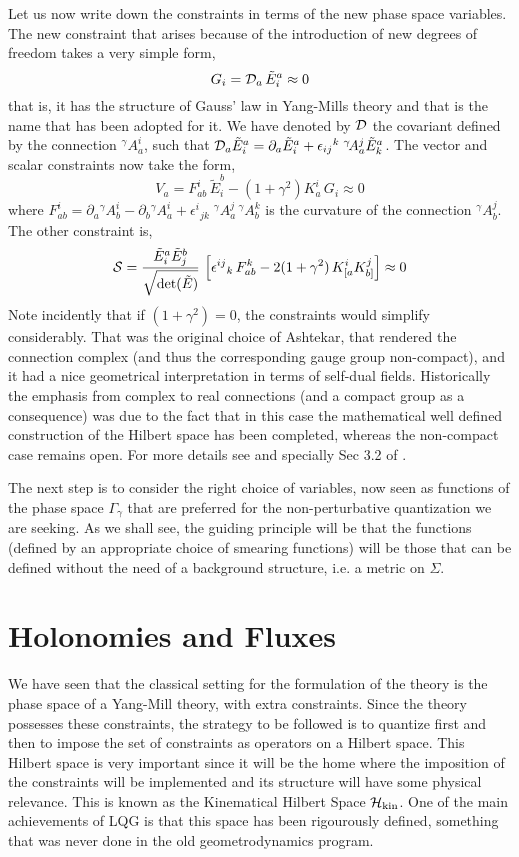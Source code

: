 \documentclass[aps,prd,tightenlines,showpacs,nofootinbib,preprint]{revtex4}
\def\be{\begin{equation}}
\def\ee{\end{equation}}
\def\tE{\tilde{E}}
\def\G{{\Gamma}}  \def\h{\hat} \def\H{{\cal H}} \def\O{{\cal O}}
\def\g{{\gamma}}  \def\a{{\alpha}} \def\l{{\lambda}}
\begin{document}
Let us now write down the constraints in terms of the new phase
space variables. The new constraint that arises because of the
introduction of new degrees of freedom takes a very simple form,
%
\be G_i={\cal D}_a\,\tE^a_i\approx 0 \ee
%
that is, it has the structure of Gauss' law in Yang-Mills theory
and that is the name that has been adopted for it. We have denoted
by ${\cal D}$ the covariant defined by the connection
${}^{\gamma}\!A_a^i$, such that ${\cal
D}_a\tE^a_i=\partial_a\tE^a_i+{\epsilon_{ij}}^{k}\;{}^{\gamma}
\!A_a^j\tE^a_k$. The vector and scalar constraints now take the
form, \be V_a=F^i_{ab}\,\tE^b_i-(1+\g^2)K^i_a\,G_i\approx 0 \ee
%
where
$F^i_{ab}=\partial_{a}{}^{\gamma}\!A_b^i-\partial_{b}{}^{\gamma}\!A_a^i+
{\epsilon^i}_{jk}\;{}^{\gamma}\!A_a^j\,{}^{\gamma}\!A_b^k$ is the
curvature of the connection ${}^{\gamma}\!A_b^j$. The other
constraint is,
%
\be \S=\frac{\tE^a_i\tE^b_j}{\sqrt{{\rm
det}(\tE)}}\,\left[{\epsilon^{ij}}_k\,F^k_{ab}-2(1+\gamma^2)
\,K^i_{[a}K^j_{b]}\right] \approx 0 \ee
%
Note incidently that if $(1+\gamma^2)=0$, the constraints would
simplify considerably. That was the original choice of Ashtekar,
that rendered the connection complex (and thus the corresponding
gauge group non-compact), and it had a nice geometrical
interpretation in terms of self-dual fields. Historically the
emphasis from complex to real connections (and a compact group as
a consequence) was due to the fact that in this case the
mathematical well defined construction of the Hilbert space has
been completed, whereas the non-compact case remains open. For
more details see \cite{AL:review} and specially Sec 3.2 of
\cite{Perez:2004hj}.

The next step is to consider the right choice of variables, now
seen as functions of the phase space $\G_\g$ that are preferred
for the non-perturbative quantization we are seeking. As we shall
see, the guiding principle will be that the functions (defined by
an appropriate choice of smearing functions) will be those that
can be defined without the need of a background structure, i.e. a
metric on $\Sigma$.

\section{Holonomies and Fluxes}
\label{sec:3}

\noindent We have seen that the classical setting for the
formulation of the theory is the phase space of a Yang-Mill
theory, with extra constraints. Since the theory possesses these
constraints, the strategy to be followed is to quantize first and
then to impose the set of constraints as operators on a Hilbert
space. This Hilbert space is very important since it will be the
home where the imposition of the constraints will be implemented
and its structure will have some physical relevance. This is known
as the Kinematical Hilbert Space ${\cal H}_{\rm kin}$. One of the
main achievements of LQG is that this space has been rigourously
defined, something that was never done in the old geometrodynamics
program.
\end{document}
